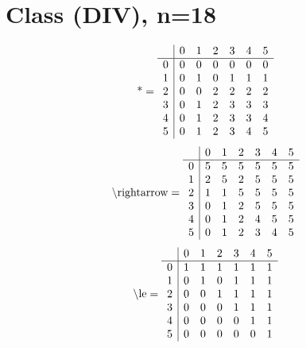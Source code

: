 \documentclass[11pt]{article}
\begin{document}
\section{Class (DIV), n=18}
\[\text{*} = 
\begin{array}{r | r r r r r r}
 & 0 & 1 & 2 & 3 & 4 & 5 \\ \hline
0 & 0 & 0 & 0 & 0 & 0 & 0 \\
1 & 0 & 1 & 0 & 1 & 1 & 1 \\
2 & 0 & 0 & 2 & 2 & 2 & 2 \\
3 & 0 & 1 & 2 & 3 & 3 & 3 \\
4 & 0 & 1 & 2 & 3 & 3 & 4 \\
5 & 0 & 1 & 2 & 3 & 4 & 5 \\
\end{array}
\]
\[\text{\textbackslash rightarrow} = 
\begin{array}{r | r r r r r r}
 & 0 & 1 & 2 & 3 & 4 & 5 \\ \hline
0 & 5 & 5 & 5 & 5 & 5 & 5 \\
1 & 2 & 5 & 2 & 5 & 5 & 5 \\
2 & 1 & 1 & 5 & 5 & 5 & 5 \\
3 & 0 & 1 & 2 & 5 & 5 & 5 \\
4 & 0 & 1 & 2 & 4 & 5 & 5 \\
5 & 0 & 1 & 2 & 3 & 4 & 5 \\
\end{array}
\]
\[\text{\textbackslash le} = 
\begin{array}{r | r r r r r r}
 & 0 & 1 & 2 & 3 & 4 & 5 \\ \hline
0 & 1 & 1 & 1 & 1 & 1 & 1 \\
1 & 0 & 1 & 0 & 1 & 1 & 1 \\
2 & 0 & 0 & 1 & 1 & 1 & 1 \\
3 & 0 & 0 & 0 & 1 & 1 & 1 \\
4 & 0 & 0 & 0 & 0 & 1 & 1 \\
5 & 0 & 0 & 0 & 0 & 0 & 1 \\
\end{array}
\]
\end{document}
